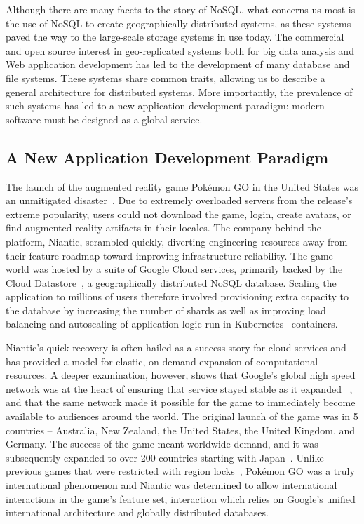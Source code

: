 Although there are many facets to the story of NoSQL, what concerns us most is the use of NoSQL to create geographically distributed systems, as these systems paved the way to the large-scale storage systems in use today.
The commercial and open source interest in geo-replicated systems both for big data analysis and Web application development has led to the development of many database and file systems.
These systems share common traits, allowing us to describe a general architecture for distributed systems.
More importantly, the prevalence of such systems has led to a new application development paradigm: modern software must be designed as a global service.

\subsection{A New Application Development Paradigm}
\label{ch02_new_software_paradigm}

The launch of the augmented reality game Pokémon GO in the United States was an unmitigated disaster~\cite{kain_pokemon_2016}.
Due to extremely overloaded servers from the release's extreme popularity, users could not download the game, login, create avatars, or find augmented reality artifacts in their locales.
The company behind the platform, Niantic, scrambled quickly, diverting engineering resources away from their feature roadmap toward improving infrastructure reliability.
The game world was hosted by a suite of Google Cloud services, primarily backed by the Cloud Datastore~\cite{cloud_datastore}, a geographically distributed NoSQL database.
Scaling the application to millions of users therefore involved provisioning extra capacity to the database by increasing the number of shards as well as improving load balancing and autoscaling of application logic run in Kubernetes~\cite{Kubernetes} containers.

Niantic's quick recovery is often hailed as a success story for cloud services and has provided a model for elastic, on demand expansion of computational resources.
A deeper examination, however, shows that Google's global high speed network was at the heart of ensuring that service stayed stable as it expanded ~\cite{stone_bringing_2016}, and that the same network made it possible for the game to immediately become available to audiences around the world.
The original launch of the game was in 5 countries -- Australia, New Zealand, the United States, the United Kingdom, and Germany.
The success of the game meant worldwide demand, and it was subsequently expanded to over 200 countries starting with Japan~\cite{yamazaki_developer_2016}.
Unlike previous games that were restricted with region locks~\cite{region_locking}, Pokémon GO was a truly international phenomenon and Niantic was determined to allow international interactions in the game's feature set, interaction which relies on Google's unified international architecture and globally distributed databases.


